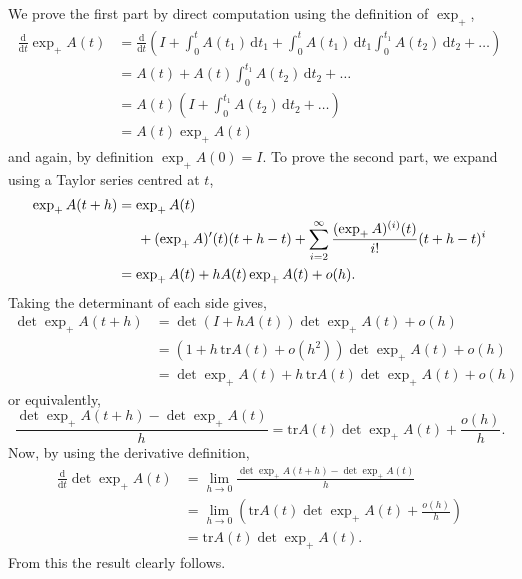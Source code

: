 \documentclass[a4paper,12pt,draft]{report}
\begin{document}
{
We prove the first part by direct computation using the definition of $\exp_+$,
\begin{align}
\frac{\mathrm{d}}{\mathrm{d} t}\exp_+ A(t) & = \frac{\mathrm{d}}{\mathrm{d} t}\left(I + \int_0^t A(t_1)\,\mathrm{d} t_1 + \int_0^t A(t_1)\,\mathrm{d} t_1 \int_0^{t_1} A(t_2)\,\mathrm{d} t_2 + \dots\right)\nonumber\\
& = A(t) + A(t)\int_0^{t_1}A(t_2)\,\mathrm{d} t_2 + \dots\nonumber\\
& = A(t)\left(I + \int_0^{t_1} A(t_2)\,\mathrm{d} t_2 + \dots \right)\nonumber\\
& = A(t)\exp_+A(t)\nonumber
\end{align}
and again, by definition $\exp_+A(0) = I$.  To prove the second part, we expand using a Taylor series centred at $t$,
\begin{align}
\exp_+A(t + h) & = \exp_+A(t) \nonumber\\
& \hspace{0.5cm} + (\exp_+A)'(t)(t + h - t) + \sum_{i = 2}^\infty \frac{(\exp_+A)^{(i)}(t)}{i!}(t + h - t)^i \nonumber\\
& = \exp_+A(t) + hA(t)\exp_+A(t) + o(h). \nonumber
\end{align}
Taking the determinant of each side gives,
\begin{align}
\det\exp_+A(t + h) & = \det(I + hA(t))\det\exp_+A(t) + o(h)\nonumber\\
& = (1 + h\,\mathrm{tr}A(t) + o(h^2))\det\exp_+A(t) + o(h)\nonumber\\
& = \det\exp_+A(t) + h\,\mathrm{tr}A(t)\det\exp_+A(t) + o(h)\nonumber
\end{align}
or equivalently,
$$
\frac{\det\exp_+A(t + h) - \det\exp_+A(t)}{h} = \mathrm{tr}A(t)\det\exp_+A(t) + \frac{o(h)}{h}.
$$
Now, by using the derivative definition,
\begin{align}
\frac{\mathrm{d}}{\mathrm{d}t}\det\exp_+A(t) & = \lim_{h \to 0} \frac{\det\exp_+A(t + h) - \det\exp_+A(t)}{h}\nonumber\\
& = \lim_{h \to 0}\left(\mathrm{tr}A(t)\det\exp_+A(t) + \frac{o(h)}{h}\right)\nonumber\\
& = \mathrm{tr}A(t)\det\exp_+A(t).\nonumber
\end{align}
From this the result clearly follows.

\qedhere
}
\end{document}
